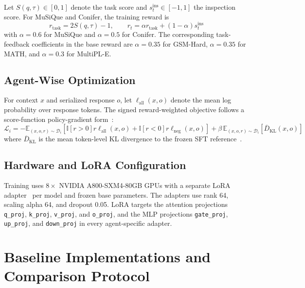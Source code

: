 Let $S(q,\tau)\in[0,1]$ denote the task score and $s_t^{\mathrm{ins}}\in[-1,1]$ the inspection score. For MuSiQue and Conifer, the training reward is
\begin{equation}
 r_{\mathrm{task}}=2S(q,\tau)-1,
 \qquad
 r_t=\alpha r_{\mathrm{task}}+(1-\alpha)s_t^{\mathrm{ins}}
 \label{eq:app-mixed-reward}
\end{equation}
with $\alpha=0.6$ for MuSiQue and $\alpha=0.5$ for Conifer. The corresponding task-feedback coefficients in the base reward are $\alpha=0.35$ for GSM-Hard, $\alpha=0.35$ for MATH, and $\alpha=0.3$ for MultiPL-E.

\subsection{Agent-Wise Optimization}

For context $x$ and serialized response $o$, let $\ell_{\mathrm{all}}(x,o)$ denote the mean log probability over response tokens. The signed reward-weighted objective follows a score-function policy-gradient form~\citep{williams1992simple}:
\begin{equation}
 \mathcal{L}_i
 =-\mathbb{E}_{(x,o,r)\sim\mathcal{D}_i}\!\left[
 \mathbb{I}[r>0]r\ell_{\mathrm{all}}(x,o)
 +\mathbb{I}[r<0]r\ell_{\mathrm{neg}}(x,o)
 \right]
 +\beta\,\mathbb{E}_{(x,o,r)\sim\mathcal{D}_i}
 \left[\overline{D}_{\mathrm{KL}}(x,o)\right]
 \label{eq:app-rwr}
\end{equation}
where $\overline{D}_{\mathrm{KL}}$ is the mean token-level KL divergence to the frozen SFT reference~\citep{ziegler2019finetuning}.

\subsection{Hardware and LoRA Configuration}

Training uses $8\times$ NVIDIA A800-SXM4-80GB GPUs with a separate LoRA adapter~\citep{hu2022lora} per model and frozen base parameters. The adapters use rank 64, scaling alpha 64, and dropout 0.05. LoRA targets the attention projections \texttt{q\_proj}, \texttt{k\_proj}, \texttt{v\_proj}, and \texttt{o\_proj}, and the MLP projections \texttt{gate\_proj}, \texttt{up\_proj}, and \texttt{down\_proj} in every agent-specific adapter.

\FloatBarrier
\section{Baseline Implementations and Comparison Protocol}
\label{app:baselines}

